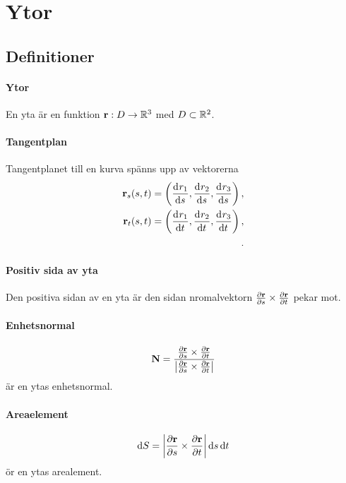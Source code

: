 \section{Ytor}

\subsection{Definitioner}

\paragraph{Ytor}
En yta är en funktion $\vect{r}: D\to\R^3$ med $D\subset\mathbb{R}^2$.

\paragraph{Tangentplan}
Tangentplanet till en kurva spänns upp av vektorerna
\begin{align*}
	\vect{r}_s(s, t) = \left(\deval{r_1}{s}{s, t}, \deval{r_2}{s}{s, t}, \deval{r_3}{s}{s, t}\right), \\
	\vect{r}_t(s, t) = \left(\deval{r_1}{t}{s, t}, \deval{r_2}{t}{s, t}, \deval{r_3}{t}{s, t}\right), \\.
\end{align*}

\paragraph{Positiv sida av yta}
Den positiva sidan av en yta är den sidan nromalvektorn $\pdv{\vect{r}}{s}\times\pdv{\vect{r}}{t}$ pekar mot.

\paragraph{Enhetsnormal}
\begin{align*}
	\vect{N} = \frac{\pdv{\vect{r}}{s}\times\pdv{\vect{r}}{t}}{\abs{\pdv{\vect{r}}{s}\times\pdv{\vect{r}}{t}}} 
\end{align*}
är en ytas enhetsnormal.

\paragraph{Areaelement}
\begin{align*}
	\dd{S} = \abs{\pdv{\vect{r}}{s}\times\pdv{\vect{r}}{t}}\dd{s}\dd{t}
\end{align*}
ör en ytas arealement.

